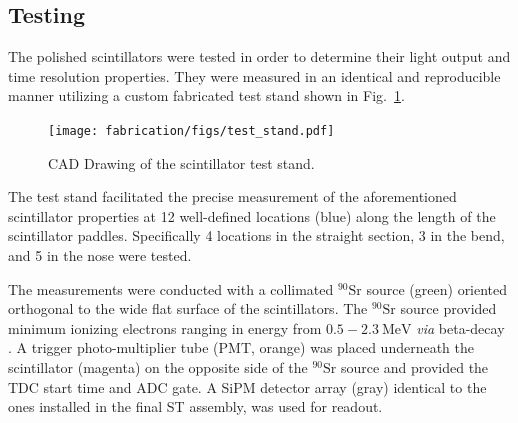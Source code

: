 
\subsection{Testing} \label{sec:fab_test}

The polished scintillators were tested in order to determine their light output and time resolution properties.  They were measured in an identical and reproducible manner utilizing a custom fabricated test stand shown in Fig.~\ref{fig:test_stand_model}. 
	\begin{figure}[!htb]
		\centering
		\texttt{[image: fabrication/figs/test\_stand.pdf]}
		\caption{CAD Drawing of the scintillator test stand.}
		\label{fig:test_stand_model}
	\end{figure}
The test stand facilitated the precise measurement of the aforementioned scintillator properties at 12 well-defined locations (blue) along the length of the scintillator paddles.  Specifically 4 locations in the straight section, 3 in the bend, and 5 in the nose were tested.  

The measurements were conducted with a collimated $\mathrm{^{90}Sr}$ source (green) oriented orthogonal to the wide flat surface of the scintillators.  The $\mathrm{^{90}Sr}$ source provided minimum ionizing electrons ranging in energy from $\mathrm{0.5-2.3~MeV}$ \textit{via} beta-decay \cite{nndc_sr90}\cite{nndc_y90}.  A trigger photo-multiplier tube (PMT, orange) was placed underneath the scintillator (magenta) on the opposite side of the $\mathrm{^{90}Sr}$ source and provided the TDC start time and ADC gate.  A SiPM detector array (gray) identical to the ones installed in the final ST assembly, was used for readout.  

